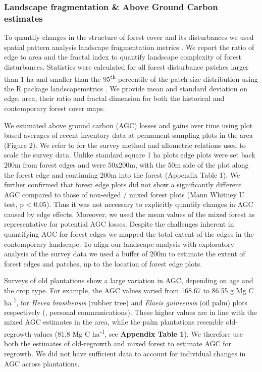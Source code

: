 \documentclass[remote sensing,article,submit,moreauthors,pdftex]{mdpi}
\begin{document}
\hypertarget{landscape-fragmentation-above-ground-carbon-estimates}{%
\subsubsection{Landscape fragmentation \& Above Ground Carbon
estimates}\label{landscape-fragmentation-above-ground-carbon-estimates}}

To quantify changes in the structure of forest cover and its
disturbances we used spatial pattern analysis landscape fragmentation
metrics \citep{dale1999}. We report the ratio of edge to area and the
fractal index to quantify landscape complexity of forest disturbances.
Statistics were calculated for all forest disturbance patches larger
than 1 ha and smaller than the 95\textsuperscript{th} percentile of the
patch size distribution using the R package landscapemetrics
\citep{hesselbarth2019}. We provide mean and standard deviation on edge,
area, their ratio and fractal dimension for both the historical and
contemporary \citet{hansen2013} forest cover maps.

We estimated above ground carbon (AGC) losses and gains over time using
plot based averages of recent inventory data at permanent sampling plots
in the area (Figure 2). We refer to \citet{Kearsley2013} for the survey
method and allometric relations used to scale the survey data. Unlike
standard square 1 ha plots edge plots were set back 200m from forest
edges and were 50x200m, with the 50m side of the plot along the forest
edge and continuing 200m into the forest (Appendix Table 1). We further
confirmed that forest edge plots did not show a significantly different
AGC compared to those of non-edged / mixed forest plots (Mann Whitney U
test, p \textless{} 0.05). Thus it was not necessary to explicitly
quantify changes in AGC caused by edge effects. Moreover, we used the
mean values of the mixed forest as representative for potential AGC
losses. Despite the challenges inherent in quantifying AGC for forest
edges we mapped the total extent of the edges in the contemporary
landscape. To align our landscape analysis with exploratory analysis of
the survey data we used a buffer of 200m to estimate the extent of
forest edges and patches, up to the location of forest edge plots.

Surveys of old plantations show a large variation in AGC, depending on
age and the crop type. For example, the AGC values varied from 168.67 to
86.55 g Mg C ha\textsuperscript{-1}, for \emph{Hevea brasiliensis}
(rubber tree) and \emph{Elaeis guineensis} (oil palm) plots respectively
(\citet{bustillo2018}, personal communications). These higher values are
in line with the mixed AGC estimates in the area, while the palm
plantations resemble old-regrowth values (81.8 Mg C
ha\textsuperscript{-1}, see \textbf{Appendix Table 1}). We therefore use
both the estimates of old-regrowth and mixed forest to estimate AGC for
regrowth. We did not have sufficient data to account for individual
changes in AGC across plantations.
\end{document}
